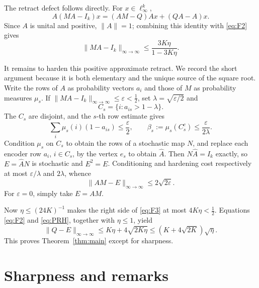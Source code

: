 \documentclass[10pt]{article}
\newcommand{\linf}{\ell_\infty}
\newcommand{\norm}[1]{\lVert #1\rVert}
\begin{document}
The retract defect follows directly.  For $x\in\linf^k$,
\[
 A(MA-I_k)x=(AM-Q)Ax+(QA-A)x.
\]
Since $A$ is unital and positive, $\norm A=1$; combining this identity with
\eqref{eq:F2} gives
\begin{equation}\label{eq:F3}
 \norm{MA-I_k}_{\infty\to\infty}
 \leq\frac{3K\eta}{1-3K\eta}.
\end{equation}

It remains to harden this positive approximate retract.  We record the short
argument because it is both elementary and the unique source of the square
root.  Write the rows of $A$ as probability vectors $a_i$ and those of $M$
as probability measures $\mu_s$.  If
$\norm{MA-I_k}_{\infty\to\infty}\leq\varepsilon<\tfrac12$, set
$\lambda=\sqrt{\varepsilon/2}$ and
\[
 C_s=\{i:a_{is}>1-\lambda\}.
\]
The $C_s$ are disjoint, and the $s$-th row estimate gives
\[
 \sum_i\mu_s(i)(1-a_{is})\leq\frac\varepsilon2,\qquad
 \beta_s:=\mu_s(C_s^c)\leq\frac{\varepsilon}{2\lambda}.
\]
Condition $\mu_s$ on $C_s$ to obtain the rows of a stochastic map $N$, and
replace each encoder row $a_i$, $i\in C_s$, by the vertex $e_s$ to obtain
$\widehat A$.  Then $N\widehat A=I_k$ exactly, so
$E=\widehat A N$ is stochastic and $E^2=E$.  Conditioning and hardening cost
respectively at most $\varepsilon/\lambda$ and $2\lambda$, whence
\begin{equation}\label{eq:PRH}
 \norm{AM-E}_{\infty\to\infty}\leq2\sqrt{2\varepsilon}.
\end{equation}
For $\varepsilon=0$, simply take $E=AM$.

Now $\eta\leq(24K)^{-1}$ makes the right side of \eqref{eq:F3} at most
$4K\eta<\tfrac12$.  Equations \eqref{eq:F2} and \eqref{eq:PRH}, together
with $\eta\leq1$, yield
\[
 \norm{Q-E}_{\infty\to\infty}
 \leq K\eta+4\sqrt{2K\eta}
 \leq (K+4\sqrt{2K})\sqrt\eta.
\]
This proves Theorem~\ref{thm:main} except for sharpness.

\section{Sharpness and remarks}
\end{document}
